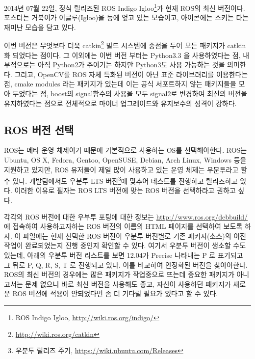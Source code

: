 2014년 07월 22일, 정식 릴리즈된 ROS Indigo Igloo\footnote{ROS Indigo Igloo, \url{http://wiki.ros.org/indigo/}}가 현재 ROS의 최신 버전이다. 포스터는 거북이가 이글루(Igloo)을 등에 엎고 있는 모습이고, 아이콘에는 스키는 타는 재미난 모습을 담고 있다.

이번 버전은 무엇보다 더욱 catkin\footnote{\url{http://wiki.ros.org/catkin}} 빌드 시스템에 중점을 두어 모든 패키지가 catkin화 되었다는 점이다. 그 이외에는 이번 버전 부터는 Python3.3 을 사용하였다는 점, 내부적으로는 아직 Python2가 주이기는 하지만 Python3도 사용 가능하는 것을 의미한다. 그리고, OpenCV를 ROS 자체 특화된 버전이 아닌 표준 라이브러리를 이용한다는 점, cmake modules 라는 패키지가 있는데 이는 공식 서포트하지 않는 패키지들을 모아 두었다는 점, boost의 signal함수의 사용을 모두 signal2로 변경하여 최신의 버전을 유지하였다는 점으로 전체적으로 마이너 업그레이드와 유지보수의 성격이 강하다.

\subsection{ROS 버전 선택}

ROS는 메타 운영 체제이기 때문에 기본적으로 사용하는 OS를 선택해야한다. ROS는 Ubuntu, OS X, Fedora, Gentoo, OpenSUSE, Debian, Arch Linux, Windows 등을 지원하고 있지만, ROS 유저들이 제일 많이 사용하고 있는 운영 체제는 우분투라고 할 수 있다. 개발팀에서도 우분투 LTS 버전\footnote{우분투 릴리즈 주기, \url{https://wiki.ubuntu.com/Releases}}에 맞추어 테스트를 진행하고 릴리즈하고 있다. 이러한 이유로 필자는 ROS LTS 버전에 맞는 ROS 버전을 선택하라고 권하고 싶다. 

각각의 ROS 버전에 대한 우부투 포팅에 대한 정보는 \url{http://www.ros.org/debbuild/} 에 접속하여 사용하고자하는 ROS 버전의 이름의 HTML 페이지를 선택하여 보도록 하자. 이 파일에는 현재 선택한 ROS 버전이 우분투 버전별로 기존 패키지(소스)의 이전 작업이 완료되었는지 진행 중인지 확인할 수 있다. 여기서 우분투 버전이 생소할 수도 있는데, 아래의 우분투 버전 리스트를 보면 12.04가 Precise 나타내는 P 로 표기되고 그 뒤로 P, Q, R, S, T 로 진행되고 있다. 이를 비교하여 안정화된 버전을 찾아야한다. ROS의 최신 버전의 경우에는 많은 패키지가 작업중으로 뜨는데 중요한 패키지가 아니고서는 문제 없으니 바로 최신 버전을 사용해도 좋고, 자신이 사용하던 패키지가 새로운 ROS 버전에 적용이 안되었다면 좀 더 기다릴 필요가 있다고 할 수 있다.\\

